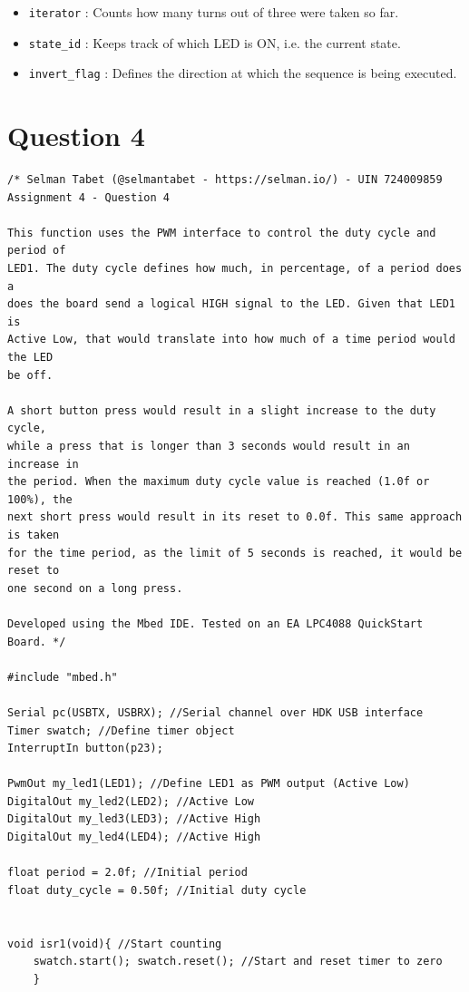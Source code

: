 \documentclass{article}
\begin{document}
\begin{itemize}
  \item \texttt{iterator} : Counts how many turns out of three were taken so far.
  \item \texttt{state\_id} : Keeps track of which LED is ON, i.e. the current state.
  \item \texttt{invert\_flag} : Defines the direction at which the sequence is being executed.
\end{itemize}

\pagebreak

\section*{Question 4}
\begin{verbatim}
/* Selman Tabet (@selmantabet - https://selman.io/) - UIN 724009859
Assignment 4 - Question 4

This function uses the PWM interface to control the duty cycle and period of
LED1. The duty cycle defines how much, in percentage, of a period does a 
does the board send a logical HIGH signal to the LED. Given that LED1 is
Active Low, that would translate into how much of a time period would the LED
be off.

A short button press would result in a slight increase to the duty cycle,
while a press that is longer than 3 seconds would result in an increase in
the period. When the maximum duty cycle value is reached (1.0f or 100%), the
next short press would result in its reset to 0.0f. This same approach is taken
for the time period, as the limit of 5 seconds is reached, it would be reset to
one second on a long press.

Developed using the Mbed IDE. Tested on an EA LPC4088 QuickStart Board. */

#include "mbed.h"

Serial pc(USBTX, USBRX); //Serial channel over HDK USB interface
Timer swatch; //Define timer object
InterruptIn button(p23);

PwmOut my_led1(LED1); //Define LED1 as PWM output (Active Low)
DigitalOut my_led2(LED2); //Active Low
DigitalOut my_led3(LED3); //Active High
DigitalOut my_led4(LED4); //Active High

float period = 2.0f; //Initial period
float duty_cycle = 0.50f; //Initial duty cycle


void isr1(void){ //Start counting
    swatch.start(); swatch.reset(); //Start and reset timer to zero
    }


\end{verbatim}
\end{document}

